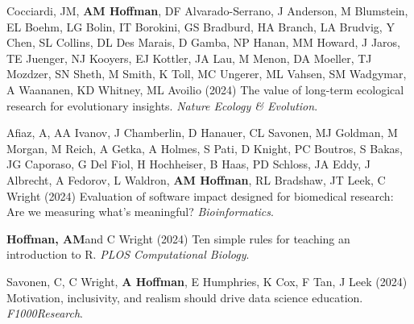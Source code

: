 \documentclass{cv}
\begin{document}
\begin{pubenum}




\item Cocciardi, JM, \textbf{AM Hoffman}, DF Alvarado-Serrano, J Anderson, M Blumstein, EL Boehm, LG Bolin, IT Borokini, GS Bradburd, HA Branch, LA Brudvig, Y Chen, SL Collins, DL Des Marais, D Gamba, NP Hanan, MM Howard, J Jaros, TE Juenger, NJ Kooyers, EJ Kottler, JA Lau, M Menon, DA Moeller, TJ Mozdzer, SN Sheth, M Smith, K Toll, MC Ungerer, ML Vahsen, SM Wadgymar, A Waananen, KD Whitney, ML Avoilio (2024) The value of long-term ecological research for evolutionary insights. \textit{Nature Ecology \& Evolution}. 

\item Afiaz, A, AA Ivanov, J Chamberlin, D Hanauer, CL Savonen, MJ Goldman, M Morgan, M Reich, A Getka, A Holmes, S Pati, D Knight, PC Boutros, S Bakas, JG Caporaso, G Del Fiol, H Hochheiser, B Haas, PD Schloss, JA Eddy, J Albrecht, A Fedorov, L Waldron, \textbf{AM Hoffman}, RL Bradshaw, JT Leek, C Wright (2024) Evaluation of software impact designed for biomedical research: Are we measuring what's meaningful? \textit{Bioinformatics}. 

\item\textbf{Hoffman, AM}\footnotemark[1] and C Wright (2024) Ten simple rules for teaching an introduction to R. \textit{PLOS Computational Biology}. 


\item Savonen, C, C Wright, \textbf{A Hoffman}, E Humphries, K Cox, F Tan, J Leek (2024) Motivation, inclusivity, and realism should drive data science education. \textit{F1000Research}. 


\end{pubenum}
\end{document}
